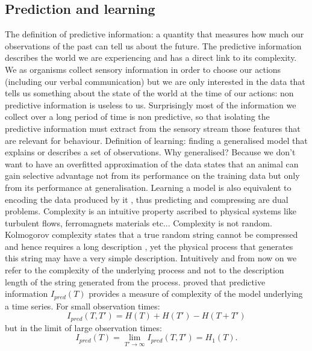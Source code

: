 \subsection{Prediction and learning}
\label{Appendix:PredictionAndLearning}
The definition of predictive information: a quantity that measures how much our
observations of the past can tell us about the future. The predictive information
 describes the world we are experiencing and has a direct link to its complexity.
We as organisms collect sensory information in order to choose our actions
(including our verbal communication) but we are only interested in the data
 that tells us something about the state of the world at the time of our actions:
 non predictive information is useless to us. Surprisingly most of the information
 we collect over a long period of time is non predictive, so that isolating the
predictive information must extract from the sensory stream those features that
 are relevant for behaviour.
Definition of learning: finding a generalised model that explains or describes
 a set of observations. Why generalised?
Because we don't want to have an overfitted approximation of the data \citep{Vapnik1998:StatisticalLearningTheory}
 states that an animal can gain selective advantage not from its performance on the
 training data but only from its performance at generalisation.
Learning a model is also equivalent to encoding the data produced by it \citep{Rissanen1989:Complexity},
thus predicting and compressing are dual problems.
Complexity is an intuitive property ascribed to physical systems like turbulent flows,
ferromagnets materials etc...
Complexity is not random. Kolmogorov complexity states that a true random string
 cannot be compressed and hence requires a long description \citep{Kolmogorov1965:InfoDefinition}, yet
 the physical process that generates this string may have a very simple description.
Intuitively and from now on we refer to the complexity of the underlying process
 and not to the description length of the string generated from the process.
\citet{Bialek2001:Complexity} proved that predictive information $I_{pred}(T)$ provides
 a measure of complexity of the model underlying a time series. For small observation times:
\begin{equation}
I_{pred}(T,T')=H(T)+H(T')-H(T+T')\label{Ipredgeneral}
\end{equation}
 but in the limit of large observation times:
\begin{equation}
I_{pred}(T)=\lim_{T'\to\infty} I_{pred}(T,T')=H_{1}(T).
\end{equation}
